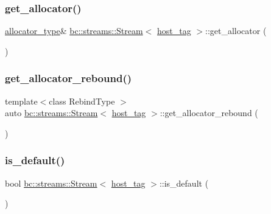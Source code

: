 \subsubsection{\texorpdfstring{get\+\_\+allocator()}{get\_allocator()}}
{\footnotesize\ttfamily \hyperlink{classbc_1_1streams_1_1Stream_3_01host__tag_01_4_a98a9510a8d26077263d3acab43094669}{allocator\+\_\+type}\& \hyperlink{classbc_1_1streams_1_1Stream}{bc\+::streams\+::\+Stream}$<$ \hyperlink{structbc_1_1host__tag}{host\+\_\+tag} $>$\+::get\+\_\+allocator (\begin{DoxyParamCaption}{ }\end{DoxyParamCaption})\hspace{0.3cm}{\ttfamily [inline]}}

\mbox{\label{classbc_1_1streams_1_1Stream_3_01host__tag_01_4_a3f7154f5a495bdfda00e73460da2ee0b}} 
\subsubsection{\texorpdfstring{get\+\_\+allocator\+\_\+rebound()}{get\_allocator\_rebound()}}
{\footnotesize\ttfamily template$<$class Rebind\+Type $>$ \\
auto \hyperlink{classbc_1_1streams_1_1Stream}{bc\+::streams\+::\+Stream}$<$ \hyperlink{structbc_1_1host__tag}{host\+\_\+tag} $>$\+::get\+\_\+allocator\+\_\+rebound (\begin{DoxyParamCaption}{ }\end{DoxyParamCaption})\hspace{0.3cm}{\ttfamily [inline]}}

\mbox{\label{classbc_1_1streams_1_1Stream_3_01host__tag_01_4_aab5f83cbae35b40c8adc0be7cd25bcab}} 
\subsubsection{\texorpdfstring{is\+\_\+default()}{is\_default()}}
{\footnotesize\ttfamily bool \hyperlink{classbc_1_1streams_1_1Stream}{bc\+::streams\+::\+Stream}$<$ \hyperlink{structbc_1_1host__tag}{host\+\_\+tag} $>$\+::is\+\_\+default (\begin{DoxyParamCaption}{ }\end{DoxyParamCaption})\hspace{0.3cm}{\ttfamily [inline]}}


